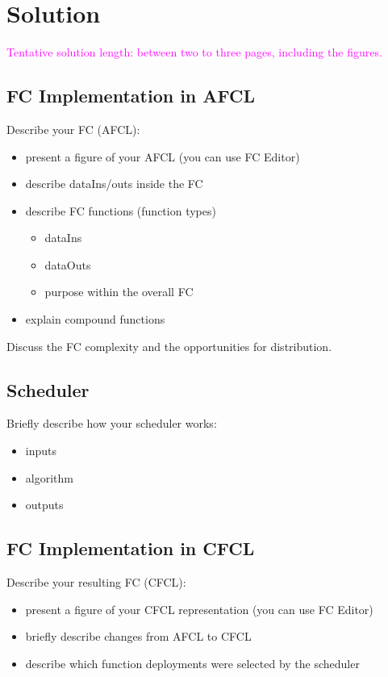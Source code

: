 \chapter{\label{chap:solution}Solution}

\textcolor{magenta}{Tentative solution length: between two to three pages, including the figures.}


%
%
%
\section{FC Implementation in AFCL}

Describe your FC (AFCL):
\begin{itemize}
    \item present a figure of your AFCL (you can use FC Editor)
    \item describe dataIns/outs inside the FC
    \item describe FC functions (function types)
    \begin{itemize}
        \item dataIns
        \item dataOuts
        \item purpose within the overall FC
    \end{itemize}
    \item explain compound functions
\end{itemize}

Discuss the FC complexity and the opportunities for distribution. 



%
%
%
\section{Scheduler}

Briefly describe how your scheduler works:
\begin{itemize}
    \item inputs
    \item algorithm
    \item outputs
\end{itemize}



%
%
%
\section{FC Implementation in CFCL}

Describe your resulting FC (CFCL):
\begin{itemize}
    \item present a figure of your CFCL representation (you can use FC Editor)
    \item briefly describe changes from AFCL to CFCL
    \item describe which function deployments were selected by the scheduler
\end{itemize}

